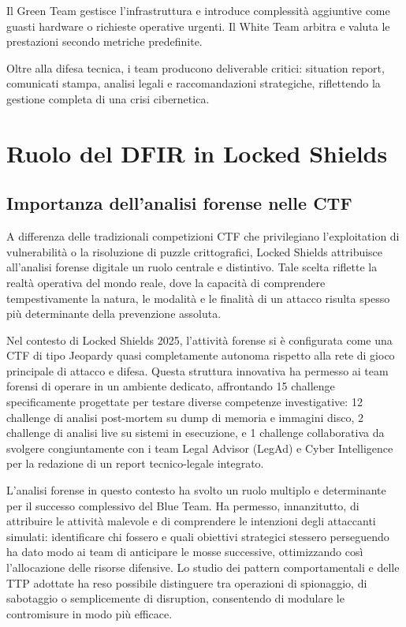 Il Green Team gestisce l'infrastruttura e introduce complessità aggiuntive come guasti hardware o richieste operative urgenti. Il White Team arbitra e valuta le prestazioni secondo metriche predefinite.

Oltre alla difesa tecnica, i team producono deliverable critici: situation report, comunicati stampa, analisi legali e raccomandazioni strategiche, riflettendo la gestione completa di una crisi cibernetica.

\section{Ruolo del DFIR in Locked Shields}

\subsection{Importanza dell'analisi forense nelle CTF}

A differenza delle tradizionali competizioni CTF che privilegiano l'exploitation di vulnerabilità o la risoluzione di puzzle crittografici, Locked Shields attribuisce all'analisi forense digitale un ruolo centrale e distintivo. Tale scelta riflette la realtà operativa del mondo reale, dove la capacità di comprendere tempestivamente la natura, le modalità e le finalità di un attacco risulta spesso più determinante della prevenzione assoluta.

Nel contesto di Locked Shields 2025, l'attività forense si è configurata come una CTF di tipo Jeopardy quasi completamente autonoma rispetto alla rete di gioco principale di attacco e difesa. Questa struttura innovativa ha permesso ai team forensi di operare in un ambiente dedicato, affrontando 15 challenge specificamente progettate per testare diverse competenze investigative: 12 challenge di analisi post-mortem su dump di memoria e immagini disco, 2 challenge di analisi live su sistemi in esecuzione, e 1 challenge collaborativa da svolgere congiuntamente con i team Legal Advisor (LegAd) e Cyber Intelligence per la redazione di un report tecnico-legale integrato.

L'analisi forense in questo contesto ha svolto un ruolo multiplo e determinante per il successo complessivo del Blue Team. Ha permesso, innanzitutto, di attribuire le attività malevole e di comprendere le intenzioni degli attaccanti simulati: identificare chi fossero e quali obiettivi strategici stessero perseguendo ha dato modo ai team di anticipare le mosse successive, ottimizzando così l’allocazione delle risorse difensive. Lo studio dei pattern comportamentali e delle TTP adottate ha reso possibile distinguere tra operazioni di spionaggio, di sabotaggio o semplicemente di disruption, consentendo di modulare le contromisure in modo più efficace.

